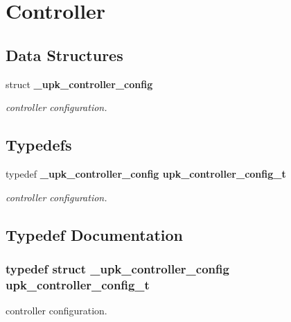 \section{Controller}
\label{group__controller}
\subsection*{Data Structures}
\begin{CompactItemize}
\item 
struct \bf{\_\-upk\_\-controller\_\-config}
\begin{CompactList}\small\item\em controller configuration. \item\end{CompactList}\end{CompactItemize}
\subsection*{Typedefs}
\begin{CompactItemize}
\item 
typedef \bf{\_\-upk\_\-controller\_\-config} \bf{upk\_\-controller\_\-config\_\-t}
\begin{CompactList}\small\item\em controller configuration. \item\end{CompactList}\end{CompactItemize}


\subsection{Typedef Documentation}
\subsubsection{\setlength{\rightskip}{0pt plus 5cm}typedef struct \bf{\_\-upk\_\-controller\_\-config}  \bf{upk\_\-controller\_\-config\_\-t}}\label{group__controller_gc1cc1c2d639ac665502fdad59f7a92d5}


controller configuration. 

